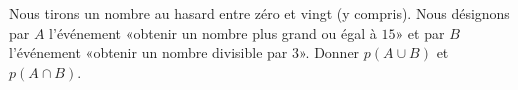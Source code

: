 
\begin{exercice}\label{exosmath-0215}

    Nous tirons un nombre au hasard entre zéro et vingt (y compris). Nous désignons par \( A\) l'événement «obtenir un nombre plus grand ou égal à \( 15\)» et par \( B\) l'événement «obtenir un nombre divisible par \( 3\)». Donner \( p(A\cup B)\) et \( p(A\cap B)\).

\end{exercice}
